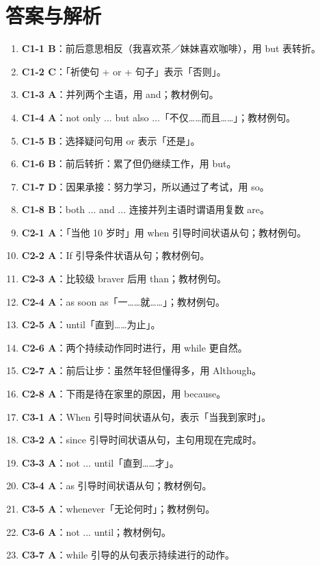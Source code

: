 \documentclass[11pt,a4paper]{ctexart}
\begin{document}
\section*{答案与解析}
\small
\begin{enumerate}[leftmargin=1.6em,itemsep=2pt]
\item \textbf{C1-1 B}：前后意思相反（我喜欢茶／妹妹喜欢咖啡），用 but 表转折。
\item \textbf{C1-2 C}：「祈使句 + or + 句子」表示「否则」。
\item \textbf{C1-3 A}：并列两个主语，用 and；教材例句。
\item \textbf{C1-4 A}：not only ... but also ...「不仅……而且……」；教材例句。
\item \textbf{C1-5 B}：选择疑问句用 or 表示「还是」。
\item \textbf{C1-6 B}：前后转折：累了但仍继续工作，用 but。
\item \textbf{C1-7 D}：因果承接：努力学习，所以通过了考试，用 so。
\item \textbf{C1-8 B}：both ... and ... 连接并列主语时谓语用复数 are。
\item \textbf{C2-1 A}：「当他 10 岁时」用 when 引导时间状语从句；教材例句。
\item \textbf{C2-2 A}：If 引导条件状语从句；教材例句。
\item \textbf{C2-3 A}：比较级 braver 后用 than；教材例句。
\item \textbf{C2-4 A}：as soon as「一……就……」；教材例句。
\item \textbf{C2-5 A}：until「直到……为止」。
\item \textbf{C2-6 A}：两个持续动作同时进行，用 while 更自然。
\item \textbf{C2-7 A}：前后让步：虽然年轻但懂得多，用 Although。
\item \textbf{C2-8 A}：下雨是待在家里的原因，用 because。
\item \textbf{C3-1 A}：When 引导时间状语从句，表示「当我到家时」。
\item \textbf{C3-2 A}：since 引导时间状语从句，主句用现在完成时。
\item \textbf{C3-3 A}：not ... until「直到……才」。
\item \textbf{C3-4 A}：as 引导时间状语从句；教材例句。
\item \textbf{C3-5 A}：whenever「无论何时」；教材例句。
\item \textbf{C3-6 A}：not ... until；教材例句。
\item \textbf{C3-7 A}：while 引导的从句表示持续进行的动作。

\end{enumerate}
\end{document}
